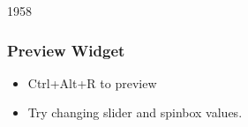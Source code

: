 
\begin{slide}{1958}
\frametitle{Preview Widget}
\begin{itemize}
\item  Ctrl+Alt+R to preview
\item  Try changing slider and spinbox values. 
\end{itemize}
\end{slide}


